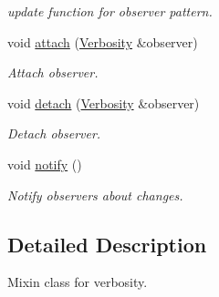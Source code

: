 \begin{DoxyCompactItemize}
\begin{DoxyCompactList}\small\item\em update function for observer pattern. \end{DoxyCompactList}\item 
\hypertarget{classSpacy_1_1Mixin_1_1MixinConnection_abb5520ee6b22dd993d78f142939a1ed4}{void \hyperlink{classSpacy_1_1Mixin_1_1MixinConnection_abb5520ee6b22dd993d78f142939a1ed4}{attach} (\hyperlink{classSpacy_1_1Mixin_1_1Verbosity}{\-Verbosity} \&observer)}\label{classSpacy_1_1Mixin_1_1MixinConnection_abb5520ee6b22dd993d78f142939a1ed4}

\begin{DoxyCompactList}\small\item\em \-Attach observer. \end{DoxyCompactList}\item 
\hypertarget{classSpacy_1_1Mixin_1_1MixinConnection_adda739590c487679c26f60e50aedb73f}{void \hyperlink{classSpacy_1_1Mixin_1_1MixinConnection_adda739590c487679c26f60e50aedb73f}{detach} (\hyperlink{classSpacy_1_1Mixin_1_1Verbosity}{\-Verbosity} \&observer)}\label{classSpacy_1_1Mixin_1_1MixinConnection_adda739590c487679c26f60e50aedb73f}

\begin{DoxyCompactList}\small\item\em \-Detach observer. \end{DoxyCompactList}\item 
\hypertarget{classSpacy_1_1Mixin_1_1MixinConnection_a1ddeaa78a3bb4a38c2cca36d1f99fe36}{void \hyperlink{classSpacy_1_1Mixin_1_1MixinConnection_a1ddeaa78a3bb4a38c2cca36d1f99fe36}{notify} ()}\label{classSpacy_1_1Mixin_1_1MixinConnection_a1ddeaa78a3bb4a38c2cca36d1f99fe36}

\begin{DoxyCompactList}\small\item\em \-Notify observers about changes. \end{DoxyCompactList}\end{DoxyCompactItemize}


\subsection{\-Detailed \-Description}
\-Mixin class for verbosity. 

